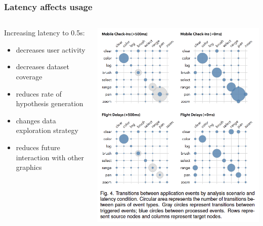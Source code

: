 
\begin{frame}
  \frametitle{Latency affects usage}
  \begin{columns}[T]
    \begin{column}{5cm}  
    Increasing latency to 0.5s:
      \begin{itemize}  
        \item \textcolor{hutton_green}{decreases user activity}
        \item decreases dataset coverage
        \item \textcolor{hutton_blue}{reduces rate of hypothesis generation}
        \item \textcolor{hutton_purple}{changes data exploration strategy}
        \item reduces future interaction with other graphics
      \end{itemize}  
    \end{column}
    \begin{column}{5cm}  
      \includegraphics[width=1\textwidth]{images/latency}    
    \end{column}
  \end{columns}      
\end{frame}
